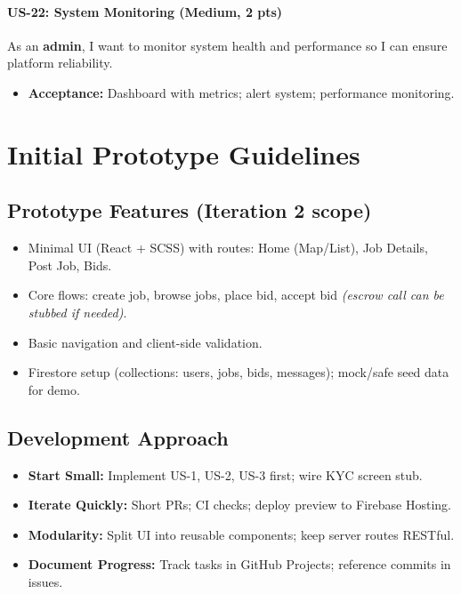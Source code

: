 \documentclass[11pt]{article}
\begin{document}
\paragraph{US-22: System Monitoring (Medium, 2 pts)}
As an \textbf{admin}, I want to monitor system health and performance so I can ensure platform reliability.
\begin{itemize}[leftmargin=1.4em]
  \item \textbf{Acceptance:} Dashboard with metrics; alert system; performance monitoring.
\end{itemize}

\section{Initial Prototype Guidelines}

\subsection{Prototype Features (Iteration 2 scope)}
\begin{itemize}[leftmargin=1.4em]
  \item Minimal UI (React + SCSS) with routes: Home (Map/List), Job Details, Post Job, Bids.
  \item Core flows: create job, browse jobs, place bid, accept bid \emph{(escrow call can be stubbed if needed)}.
  \item Basic navigation and client-side validation.
  \item Firestore setup (collections: users, jobs, bids, messages); mock/safe seed data for demo.
\end{itemize}

\subsection{Development Approach}
\begin{itemize}[leftmargin=1.4em]
  \item \textbf{Start Small:} Implement US-1, US-2, US-3 first; wire KYC screen stub.
  \item \textbf{Iterate Quickly:} Short PRs; CI checks; deploy preview to Firebase Hosting.
  \item \textbf{Modularity:} Split UI into reusable components; keep server routes RESTful.
  \item \textbf{Document Progress:} Track tasks in GitHub Projects; reference commits in issues.
\end{itemize}
\end{document}
